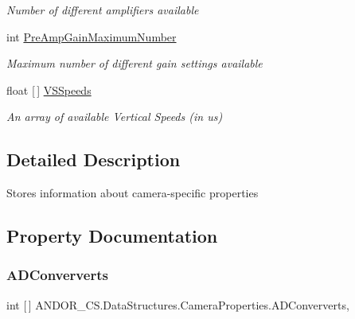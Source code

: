 \begin{DoxyCompactItemize}
\begin{DoxyCompactList}\small\item\em Number of different amplifiers available \end{DoxyCompactList}\item 
int \hyperlink{struct_a_n_d_o_r___c_s_1_1_data_structures_1_1_camera_properties_a913b38d6ae6e950b07f9e4c1be0c0576}{Pre\+Amp\+Gain\+Maximum\+Number}
\begin{DoxyCompactList}\small\item\em Maximum number of different gain settings available \end{DoxyCompactList}\item 
float \mbox{[}$\,$\mbox{]} \hyperlink{struct_a_n_d_o_r___c_s_1_1_data_structures_1_1_camera_properties_a8da952484caff7f79e2b64aaebad4729}{V\+S\+Speeds}
\begin{DoxyCompactList}\small\item\em An array of available Vertical Speeds (in us) \end{DoxyCompactList}\end{DoxyCompactItemize}


\subsection{Detailed Description}
Stores information about camera-\/specific properties 



\subsection{Property Documentation}
\mbox{\label{struct_a_n_d_o_r___c_s_1_1_data_structures_1_1_camera_properties_ab0203f6cd04c197000e312cff3e7990d}} 
\subsubsection{\texorpdfstring{A\+D\+Conververts}{ADConververts}}
{\footnotesize\ttfamily int \mbox{[}$\,$\mbox{]} A\+N\+D\+O\+R\+\_\+\+C\+S.\+Data\+Structures.\+Camera\+Properties.\+A\+D\+Conververts\hspace{0.3cm}{\ttfamily [get]}, {\ttfamily [set]}}



